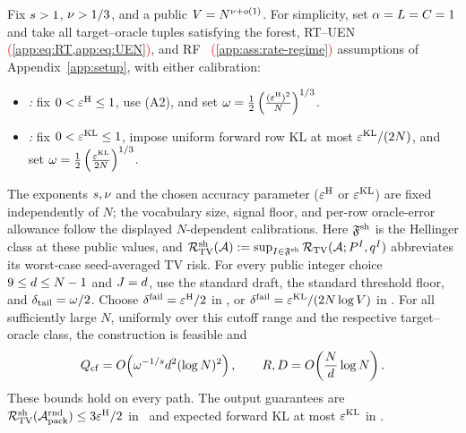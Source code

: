 \begin{corollary}
\label{app:cor:fixed-accuracy-main}
Fix $s>1$, $\nu>1/3$, and a public
$V=N^{\nu+o(1)}$.
For simplicity, set $\alpha=L=C=1$ and
take all target--oracle tuples satisfying the forest, RT--UEN\textcolor{red}{~%
(\cref{app:eq:RT,app:eq:UEN})}, and RF\textcolor{red}{~%
(\cref{app:ass:rate-regime})}
assumptions of Appendix~\ref{app:setup}, with either calibration:
\begin{itemize}
 \item \emph{\HellingerCaseTitle:} fix $0<\varepsilon^{\mathrm H}\le1$,
 use (A2), and set $\omega=\frac12 \left(\frac{(\varepsilon^{\mathrm H})^2}{N}\right)^{1/3}$.
 \item \emph{\KLCaseTitle:} fix $0<\varepsilon^{\mathrm{KL}}\le1$,
 impose uniform forward row KL at most $\varepsilon^{\mathrm{KL}}/(2N)$,
 and set $\omega=\frac12 \left(\frac{\varepsilon^{\mathrm{KL}}}{2N}\right)^{1/3}$.
\end{itemize}
The exponents $s,\nu$ and the chosen
accuracy parameter ($\varepsilon^{\mathrm H}$ or $\varepsilon^{\mathrm{KL}}$) are fixed
independently of $N$; the vocabulary size, signal floor, and per-row
oracle-error allowance follow the displayed $N$-dependent calibrations.
Here $\mathfrak F^{\mathrm{sh}}$ is the Hellinger class at these public values, and
$\mathcal R_{\mathrm{TV}}^{\mathrm{sh}}(\mathcal A):=\sup_{I\in\mathfrak F^{\mathrm{sh}}}
 \mathcal R_{\mathrm{TV}}(\mathcal A;P^{I},q^{I})$
abbreviates its worst-case seed-averaged TV risk.
For every public integer choice $9\le d\le N-1$ and
$J=d$, use the standard draft, the standard threshold
floor, and $\delta_{\mathrm{tail}}=\omega/2$.
Choose $\delta^{\mathrm{fail}}=\varepsilon^{\mathrm H}/2$ in \HellingerCase, or
$\delta^{\mathrm{fail}}=\varepsilon^{\mathrm{KL}}/(2N\log V)$ in \KLCase.
For all sufficiently large $N$, uniformly over this cutoff range and
the respective target--oracle class, the construction is feasible and
\begin{equation}
 Q_{\mathrm{cf}}
 =O\!\left(\omega^{-1/s}
             d^2(\log N)^2\right),
 \qquad
 R,D
 =O\!\left(\frac N{d}\log N\right).
 \label{app:eq:fixed-accuracy-resources}
\end{equation}
These bounds hold on every path. The output guarantees are
$\mathcal R_{\mathrm{TV}}^{\mathrm{sh}}(\mathcal A_{\mathrm{pack}}^{\mathrm{rnd}})\le3\varepsilon^{\mathrm H}/2$ in
\HellingerCase\ and expected forward KL at most $\varepsilon^{\mathrm{KL}}$
in \KLCase.


\end{corollary}
